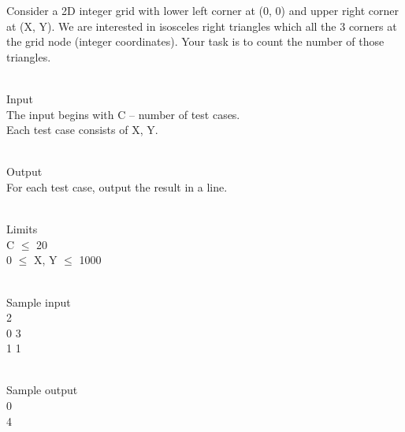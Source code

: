 



   Consider a 2D integer grid with lower left corner at (0, 0) and upper right corner at (X, Y). We are interested in isosceles right triangles which all the 3 corners at the grid node (integer coordinates). Your task is to count the number of those triangles.  


\\   Input   
\\   The input begins with C – number of test cases.   
\\   Each test case consists of X, Y.  


\\   Output   
\\   For each test case, output the result in a line.  


\\   Limits   
\\   C  $\le$  20   
\\   0  $\le$  X, Y  $\le$  1000  


\\   Sample input   
\\   2   
\\   0 3   
\\   1 1  


\\   Sample output   
\\   0   
\\   4  
